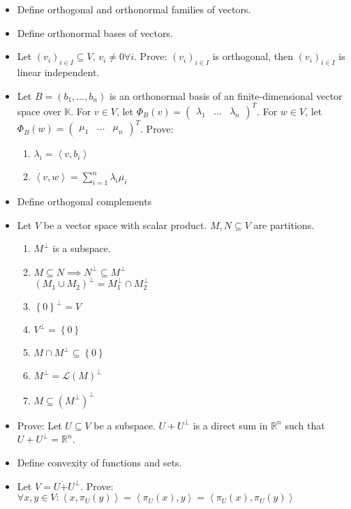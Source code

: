 \documentclass[a4paper]{article}
\newcommand{\set}[1]{\left\{#1\right\}}
\newcommand{\ip}[2]{\left\langle#1,#2\right\rangle} %
\begin{document}
\begin{itemize}
  \item Define orthogonal and orthonormal families of vectors.
  \item Define orthonormal bases of vectors.
  \item Let $(v_i)_{i \in I} \subseteq V$, $v_i \neq 0 \forall i$. Prove: $(v_i)_{i \in I}$ is orthogonal, then $(v_i)_{i \in I}$ is linear independent.
  \item Let $B = (b_1, \ldots, b_n)$ is an orthonormal basis of an finite-dimensional vector space over $\mathbb K$.
    For $v \in V$, let $\Phi_B(v) = \begin{pmatrix} \lambda_1 & \dots & \lambda_n \end{pmatrix}^T$.
    For $w \in V$, let $\Phi_B(w) = \begin{pmatrix} \mu_1 & \dots & \mu_n \end{pmatrix}^T$. Prove:
    \begin{enumerate}
      \item $\lambda_i = \ip{v}{b_i}$
      \item $\ip vw = \sum_{i=1}^n \lambda_i \overline{\mu_i}$
    \end{enumerate}
  \item Define orthogonal complements
  \item Let $V$ be a vector space with scalar product. $M, N \subseteq V$ are partitions.
    \begin{enumerate}
      \item $M^\bot$ is a subspace.
      \item $M \subseteq N \implies N^\bot \subseteq M^\bot$ \\
        $(M_1 \cup M_2)^\bot = M_1^\bot \cap M_2^\bot$
      \item $\set{0}^\bot = V$
      \item $V^\bot = \set{0}$
      \item $M \cap M^\bot \subseteq \set{0}$
      \item $M^\bot = \mathcal L(M)^\bot$
      \item $M \subseteq (M^\bot)^\bot$
    \end{enumerate}
  \item Prove: Let $U \subseteq V$ be a subspace. $U + U^\bot$ is a direct sum in $\mathbb R^n$ such that $U + U^\bot = \mathbb R^n$.
  \item Define convexity of functions and sets.
  \item Let $V = U \dot+ U^{\bot}$. Prove: $\forall x, y \in V: \ip{x}{\pi_{U}(y)} = \ip{\pi_U(x)}{y} = \ip{\pi_U(x)}{\pi_U(y)}$

\end{itemize}
\end{document}
